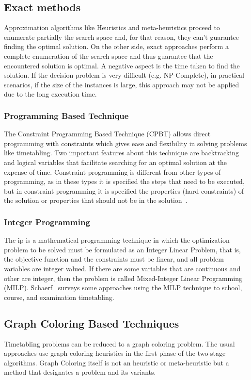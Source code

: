 \subsection{Exact methods}
\label{subsection:exactmethods}
Approximation algorithms like Heuristics and meta-heuristics proceed to enumerate partially the search space and, for that reason, they can't guarantee finding the optimal solution. On the other side, exact approaches perform a complete enumeration of the search space and thus guarantee that the encountered solution is optimal. A negative aspect is the time taken to find the solution. If the decision problem is very difficult (e.g. NP-Complete), in practical scenarios, if the size of the instances is large, this approach may not be applied due to the long execution time.\\

\subsubsection{Programming Based Technique}
The Constraint Programming Based Technique (CPBT) allows direct programming with constraints which gives ease and flexibility in solving problems like timetabling. Two important features about this technique are backtracking and logical variables that facilitate searching for an optimal solution at the expense of time. Constraint programming is different from other types of programming, as in these types it is specified the steps that need to be executed, but in constraint programming it is specified the properties (hard constraints) of the solution or properties that should not be in the solution~\cite{Qu2009}.\\

\subsubsection{Integer Programming}
The \gls{ip} is a mathematical programming technique in which the optimization problem to be solved must be formulated as an Integer Linear Problem, that is, the objective function and the constraints must be linear, and all problem variables are integer valued. If there are some variables that are continuous and other are integer, then the problem is called Mixed-Integer Linear Programming (MILP). Schaerf~\cite{Schaerf1999} surveys some approaches using the MILP technique to school, course, and examination timetabling.

\subsection{Graph Coloring Based Techniques}
\label{subsection:graphcoloring}
Timetabling problems can be reduced to a graph coloring problem. The usual approaches use graph coloring heuristics in the first phase of the two-stage algorithms. Graph Coloring itself is not an heuristic or meta-heuristic but a method that designates a problem and its variants.\\

